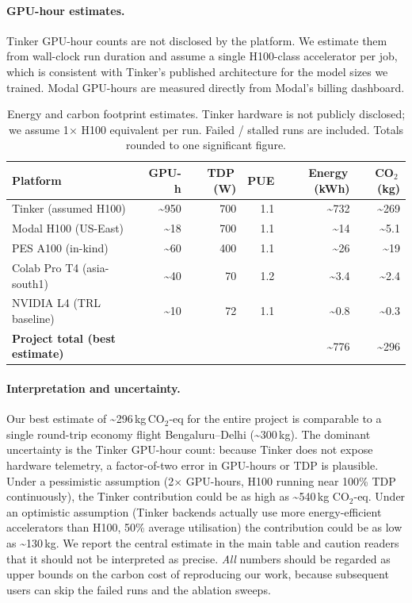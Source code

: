 \paragraph{GPU-hour estimates.}
Tinker GPU-hour counts are not disclosed by the platform. We estimate them
from wall-clock run duration and assume a single H100-class accelerator per
job, which is consistent with Tinker's published architecture for the
model sizes we trained. Modal GPU-hours are measured directly from Modal's
billing dashboard.

\begin{table}[h]
\centering
\small
\caption{Energy and carbon footprint estimates. Tinker hardware is not
publicly disclosed; we assume 1$\times$ H100 equivalent per run. Failed /
stalled runs are included. Totals rounded to one significant figure.}
\label{tab:carbon2}
\begin{tabular}{lrrrrr}
\toprule
\textbf{Platform} & \textbf{GPU-h} & \textbf{TDP\,(W)} & \textbf{PUE} &
\textbf{Energy\,(kWh)} & \textbf{CO$_2$\,(kg)} \\
\midrule
Tinker (assumed H100)   & \textasciitilde 950 & 700 & 1.1 & \textasciitilde 732 & \textasciitilde 269 \\
Modal H100 (US-East)    & \textasciitilde 18  & 700 & 1.1 & \textasciitilde 14  & \textasciitilde 5.1 \\
PES A100 (in-kind)      & \textasciitilde 60  & 400 & 1.1 & \textasciitilde 26  & \textasciitilde 19   \\
Colab Pro T4 (asia-south1) & \textasciitilde 40 & 70 & 1.2 & \textasciitilde 3.4 & \textasciitilde 2.4  \\
NVIDIA L4 (TRL baseline)   & \textasciitilde 10 & 72 & 1.1 & \textasciitilde 0.8 & \textasciitilde 0.3  \\
\midrule
\textbf{Project total (best estimate)} & & & & \textasciitilde 776 & \textasciitilde 296 \\
\bottomrule
\end{tabular}
\end{table}

\paragraph{Interpretation and uncertainty.}
Our best estimate of \textasciitilde 296\,kg\,CO$_2$-eq for the entire
project is comparable to a single round-trip economy flight
Bengaluru--Delhi (\textasciitilde 300\,kg). The dominant uncertainty is
the Tinker GPU-hour count: because Tinker does not expose hardware telemetry,
a factor-of-two error in GPU-hours or TDP is plausible. Under a pessimistic
assumption (2$\times$ GPU-hours, H100 running near 100\% TDP continuously),
the Tinker contribution could be as high as \textasciitilde 540\,kg CO$_2$-eq.
Under an optimistic assumption (Tinker backends actually use more
energy-efficient accelerators than H100, 50\% average utilisation) the
contribution could be as low as \textasciitilde 130\,kg. We report the
central estimate in the main table and caution readers that it should not
be interpreted as precise. \emph{All} numbers should be regarded as upper
bounds on the carbon cost of reproducing our work, because subsequent
users can skip the failed runs and the ablation sweeps.

